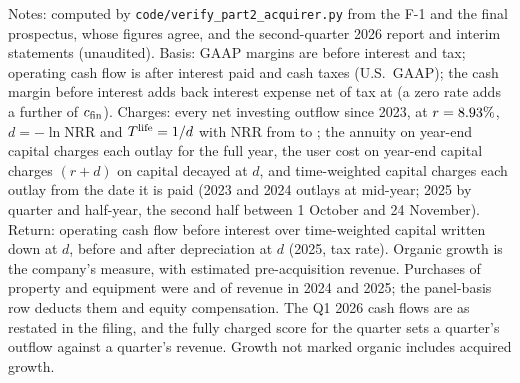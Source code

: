 \begin{table}[!tbp]
\smallskip
\begin{minipage}{0.97\linewidth}\footnotesize
Notes: computed by \texttt{code/verify\_part2\_acquirer.py} from the F-1 and the final prospectus, whose figures agree, and the second-quarter 2026 report and interim statements (unaudited). Basis: GAAP margins are before interest and tax; operating cash flow is after interest paid and cash taxes (U.S.\ GAAP); the cash margin before interest adds back interest expense net of tax at \acqTauIres{} (a zero rate adds a further \acqTauIres{} of $c_{\rm fin}$). Charges: every net investing outflow since 2023, at $r=8.93\%$, $d=-\ln\mathrm{NRR}$ and $T^{\rm life}=1/d$ with NRR from \acqNrrLo{} to \acqNrrHi; the annuity on year-end capital charges each outlay for the full year, the user cost on year-end capital charges $(r+d)$ on capital decayed at $d$, and time-weighted capital charges each outlay from the date it is paid (2023 and 2024 outlays at mid-year; 2025 by quarter and half-year, the second half between 1 October and 24 November). Return: operating cash flow before interest over time-weighted capital written down at $d$, before and after depreciation at $d$ (2025, \acqTauIres{} tax rate). Organic growth is the company's measure, with estimated pre-acquisition revenue. Purchases of property and equipment were \acqCapexRevTwentyFour{} and \acqCapexRevTwentyFive{} of revenue in 2024 and 2025; the panel-basis row deducts them and equity compensation. The Q1 2026 cash flows are as restated in the filing, and the fully charged score for the quarter sets a quarter's outflow against a quarter's revenue. Growth not marked organic includes acquired growth.
\end{minipage}
\end{table}

